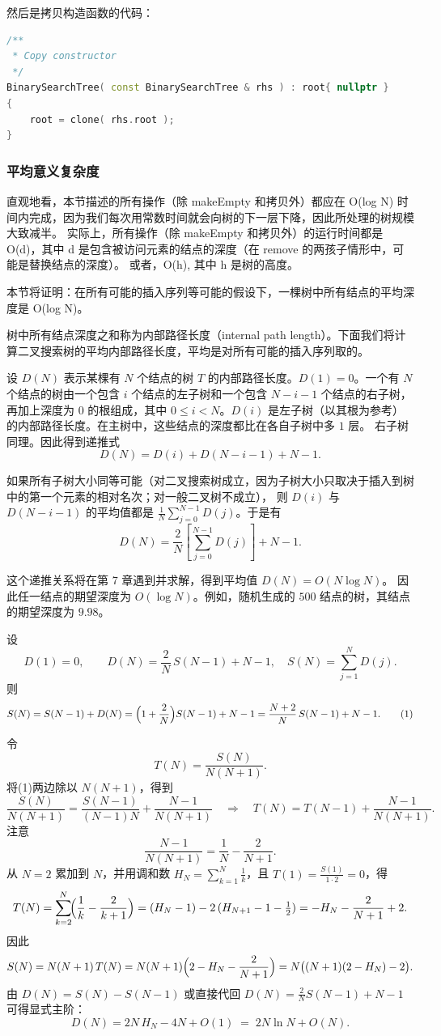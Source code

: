\documentclass[a4paper]{ctexart}
\theoremstyle{definition}
\theoremstyle{definition}
\begin{document}
然后是拷贝构造函数的代码：
\begin{lstlisting}[language=C++]
/**
 * Copy constructor
 */
BinarySearchTree( const BinarySearchTree & rhs ) : root{ nullptr }
{
    root = clone( rhs.root );
}
\end{lstlisting}

\subsubsection*{平均意义复杂度}

直观地看，本节描述的所有操作（除 makeEmpty 和拷贝外）都应在 O(log N) 时间内完成，因为我们每次用常数时间就会向树的下一层下降，因此所处理的树规模大致减半。
实际上，所有操作（除 makeEmpty 和拷贝外）的运行时间都是 O(d)，其中 d 是包含被访问元素的结点的深度（在 remove 的两孩子情形中，可能是替换结点的深度）。
或者，O(h), 其中 h 是树的高度。

本节将证明：在所有可能的插入序列等可能的假设下，一棵树中所有结点的平均深度是 O(log N)。

树中所有结点深度之和称为内部路径长度（internal path length）。下面我们将计算二叉搜索树的平均内部路径长度，平均是对所有可能的插入序列取的。

设 $D(N)$ 表示某棵有 $N$ 个结点的树 $T$ 的内部路径长度。$D(1)=0$。一个有 $N$ 个结点的树由一个包含 $i$ 个结点的左子树和一个包含 $N-i-1$ 个结点的右子树，
再加上深度为 $0$ 的根组成，其中 $0 \le i < N$。$D(i)$ 是左子树（以其根为参考）的内部路径长度。在主树中，这些结点的深度都比在各自子树中多 $1$ 层。
右子树同理。因此得到递推式
\[
D(N) = D(i) + D(N - i - 1) + N - 1.
\]

如果所有子树大小同等可能（对二叉搜索树成立，因为子树大小只取决于插入到树中的第一个元素的相对名次；对一般二叉树不成立），
则 $D(i)$ 与 $D(N-i-1)$ 的平均值都是
$\frac{1}{N}\sum_{j=0}^{N-1} D(j)$。于是有
\[
D(N) = \frac{2}{N}\left[\sum_{j=0}^{N-1} D(j)\right] + N - 1.
\]

这个递推关系将在第 7 章遇到并求解，得到平均值 $D(N) = O(N \log N)$。
因此任一结点的期望深度为 $O(\log N)$。例如，随机生成的 $500$ 结点的树，其结点的期望深度为 $9.98$。

设
\[
D(1)=0,\qquad D(N)=\frac{2}{N}\,S(N-1)+N-1,\quad
S(N)=\sum_{j=1}^{N} D(j).
\]
则
\[
S(N)=S(N-1)+D(N)
     =\Bigl(1+\frac{2}{N}\Bigr)S(N-1)+N-1
     =\frac{N+2}{N}\,S(N-1)+N-1. \tag{1}
\]

令
\[
T(N)=\frac{S(N)}{N(N+1)}.
\]
将(1)两边除以 $N(N+1)$，得到
\[
\frac{S(N)}{N(N+1)}=\frac{S(N-1)}{(N-1)N}+\frac{N-1}{N(N+1)}
\quad\Longrightarrow\quad
T(N)=T(N-1)+\frac{N-1}{N(N+1)}.
\]
注意
\[
\frac{N-1}{N(N+1)}=\frac{1}{N}-\frac{2}{N+1}.
\]
从 $N=2$ 累加到 $N$，并用调和数 $H_N=\sum_{k=1}^{N}\frac1k$，且
$T(1)=\frac{S(1)}{1\cdot2}=0$，得
\[
T(N)=\sum_{k=2}^{N}\!\Bigl(\frac{1}{k}-\frac{2}{k+1}\Bigr)
     =(H_N-1)-2\,(H_{N+1}-1-\tfrac12)
     =-H_N-\frac{2}{N+1}+2.
\]
因此
\[
S(N)=N(N+1)\,T(N)
    =N(N+1)\Bigl(2-H_N-\frac{2}{N+1}\Bigr)
    =N\bigl((N+1)(2-H_N)-2\bigr).
\]
由 $D(N)=S(N)-S(N-1)$ 或直接代回
$D(N)=\frac{2}{N}S(N-1)+N-1$ 可得显式主阶：
\[
D(N)=2N\,H_N-4N+O(1)\;=\;2N\ln N+O(N).
\]
\end{document}
